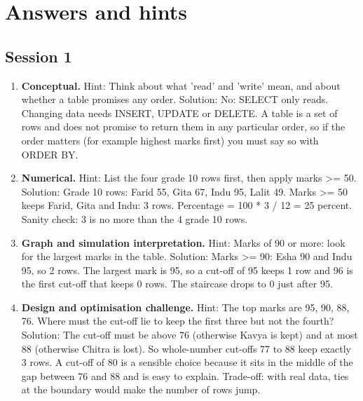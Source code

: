 \documentclass[11pt,a4paper]{article}
\begin{document}
\section{Answers and hints}

\subsection*{Session 1}
\begin{enumerate}[nosep]
\item \textbf{Conceptual.} Hint: Think about what 'read' and 'write' mean, and about whether a table promises any order. Solution: No: SELECT only reads. Changing data needs INSERT, UPDATE or DELETE. A table is a set of rows and does not promise to return them in any particular order, so if the order matters (for example highest marks first) you must say so with ORDER BY.
\item \textbf{Numerical.} Hint: List the four grade 10 rows first, then apply marks \textgreater{}= 50. Solution: Grade 10 rows: Farid 55, Gita 67, Indu 95, Lalit 49. Marks \textgreater{}= 50 keeps Farid, Gita and Indu: 3 rows. Percentage = 100 * 3 / 12 = 25 percent. Sanity check: 3 is no more than the 4 grade 10 rows.
\item \textbf{Graph and simulation interpretation.} Hint: Marks of 90 or more: look for the largest marks in the table. Solution: Marks \textgreater{}= 90: Esha 90 and Indu 95, so 2 rows. The largest mark is 95, so a cut-off of 95 keeps 1 row and 96 is the first cut-off that keeps 0 rows. The staircase drops to 0 just after 95.
\item \textbf{Design and optimisation challenge.} Hint: The top marks are 95, 90, 88, 76. Where must the cut-off lie to keep the first three but not the fourth? Solution: The cut-off must be above 76 (otherwise Kavya is kept) and at most 88 (otherwise Chitra is lost). So whole-number cut-offs 77 to 88 keep exactly 3 rows. A cut-off of 80 is a sensible choice because it sits in the middle of the gap between 76 and 88 and is easy to explain. Trade-off: with real data, ties at the boundary would make the number of rows jump.
\end{enumerate}
\end{document}
